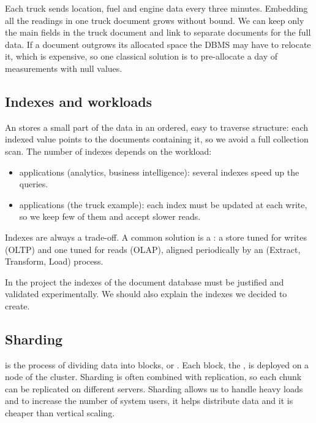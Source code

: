 \begin{example}
Each truck sends location, fuel and engine data every three minutes. Embedding all the readings in one truck document grows without bound. We can keep only the main fields in the truck document and link to separate documents for the full data. If a document outgrows its allocated space the DBMS may have to relocate it, which is expensive, so one classical solution is to pre-allocate a day of measurements with null values.
\end{example}

\subsection{Indexes and workloads}
An  stores a small part of the data in an ordered, easy to traverse structure: each indexed value points to the documents containing it, so we avoid a full collection scan. The number of indexes depends on the workload:
\begin{itemize}
  \item {} applications (analytics, business intelligence): several indexes speed up the queries.
  \item {} applications (the truck example): each index must be updated at each write, so we keep few of them and accept slower reads.
\end{itemize}
Indexes are always a trade-off. A common solution is a : a store tuned for writes (OLTP) and one tuned for reads (OLAP), aligned periodically by an  (Extract, Transform, Load) process.

\begin{remark}
In the project the indexes of the document database must be justified and validated experimentally. We should also explain the indexes we decided  to create.
\end{remark}

\subsection{Sharding}
 is the process of dividing data into blocks, or . Each block, the , is deployed on a node of the cluster. Sharding is often combined with replication, so each chunk can be replicated on different servers. Sharding allows us to handle heavy loads and to increase the number of system users, it helps distribute data and it is cheaper than vertical scaling.


